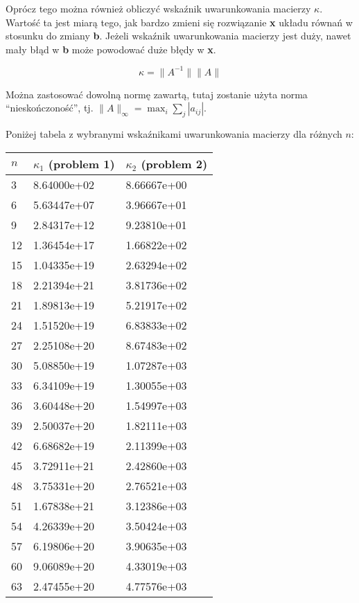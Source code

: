 \documentclass{article}
\begin{document}
Oprócz tego można również obliczyć wskaźnik uwarunkowania macierzy $\kappa$. Wartość ta jest miarą tego, jak bardzo zmieni się rozwiązanie
\textbf{x} układu równań w stosunku do zmiany \textbf{b}. Jeżeli wskaźnik uwarunkowania macierzy jest duży, nawet mały błąd w 
\textbf{b} może powodować duże błędy w \textbf{x}.

$$\kappa=\|A^{-1}\|\|A\|$$

Można zastosować dowolną normę zawartą, tutaj zostanie użyta norma ``nieskończoność'', tj. $\displaystyle\|A\|_{\infty}=\max_{i}\sum_{j}|a_{ij}|$.

Poniżej tabela z wybranymi wskaźnikami uwarunkowania macierzy dla różnych $n$:

\begin{table}[H]
\centering
\begin{tabular}{|l|l|l|}
\hline
$n$ & $\kappa_1$ (problem 1) & $\kappa_2$ (problem 2)\\ \hline
3 & 8.64000e+02 & 8.66667e+00 \\ \hline
6 & 5.63447e+07 & 3.96667e+01 \\ \hline
9 & 2.84317e+12 & 9.23810e+01 \\ \hline
12 & 1.36454e+17 & 1.66822e+02 \\ \hline
15 & 1.04335e+19 & 2.63294e+02 \\ \hline
18 & 2.21394e+21 & 3.81736e+02 \\ \hline
21 & 1.89813e+19 & 5.21917e+02 \\ \hline
24 & 1.51520e+19 & 6.83833e+02 \\ \hline
27 & 2.25108e+20 & 8.67483e+02 \\ \hline
30 & 5.08850e+19 & 1.07287e+03 \\ \hline
33 & 6.34109e+19 & 1.30055e+03 \\ \hline
36 & 3.60448e+20 & 1.54997e+03 \\ \hline
39 & 2.50037e+20 & 1.82111e+03 \\ \hline
42 & 6.68682e+19 & 2.11399e+03 \\ \hline
45 & 3.72911e+21 & 2.42860e+03 \\ \hline
48 & 3.75331e+20 & 2.76521e+03 \\ \hline
51 & 1.67838e+21 & 3.12386e+03 \\ \hline
54 & 4.26339e+20 & 3.50424e+03 \\ \hline
57 & 6.19806e+20 & 3.90635e+03 \\ \hline
60 & 9.06089e+20 & 4.33019e+03 \\ \hline
63 & 2.47455e+20 & 4.77576e+03 \\ \hline

\end{tabular}
\end{table}
\end{document}
